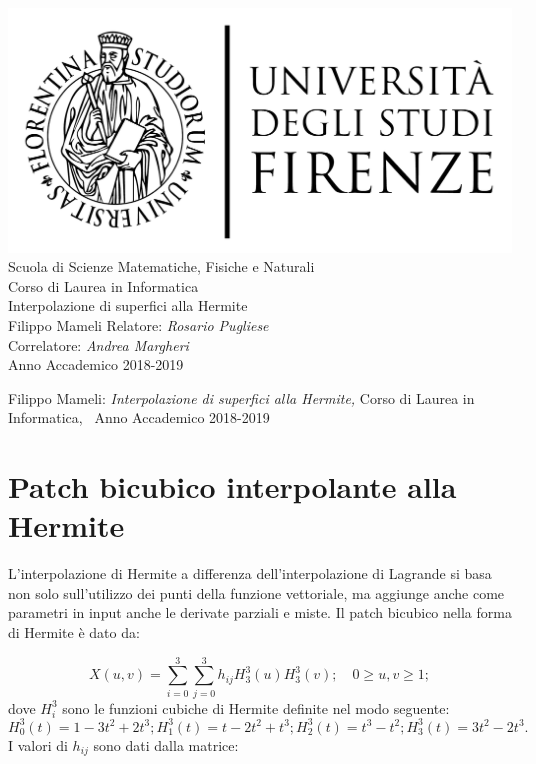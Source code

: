 \documentclass[12pt]{article}
\newcommand{\myItalianTitle}{Interpolazione di superfici alla Hermite}
\newcommand{\myDegree}{Corso di Laurea in Informatica\xspace}
\newcommand{\myName}{Filippo Mameli\xspace}
\newcommand{\myFaculty}{Scuola di Scienze Matematiche, Fisiche e Naturali\xspace}
\newcommand{\myUni}{\protect{Universit\`a degli Studi di Firenze}\xspace}
\newcommand{\myTime}{Anno Accademico 2018-2019\xspace}
\begin{document}
\begin{titlepage}
	\begin{center}
   	\large
      \hfill
      \vfill
      \begingroup
         \includegraphics[scale=0.3]{img/LOGO.pdf}\\
			\myFaculty \\
			\myDegree \\
			\vspace{0.5cm}
      \endgroup
      \vfill
      \begingroup
		  \myItalianTitle \\ 
	\bigskip
      \endgroup
      \myName
      \vfill
      \vfill
      Relatore: \emph{Rosario Pugliese}\\
      Correlatore: \emph{Andrea Margheri}\\
      \vfill
      \vfill
      \myTime
      \vfill
	\end{center}
\end{titlepage}
   \newpage
	\thispagestyle{empty}
	\hfill
	\vfill
	\noindent\myName:
	\textit{\myItalianTitle,}
	\myDegree, \textcopyright\ \myTime


\section{Patch bicubico interpolante alla Hermite}

L'interpolazione di Hermite a differenza dell'interpolazione di Lagrande si basa non solo
sull'utilizzo dei punti della funzione vettoriale, ma aggiunge anche come parametri in input
anche le derivate parziali e miste. Il patch bicubico nella forma di Hermite è dato da:

$$ X(u,v) = \sum_{i=0}^{3}\sum_{j=0}^{3} h_{ij}H_3^3(u)H_3^3(v); \hspace{1em} 0 \geq u, v \geq 1;$$
dove $H_i^3$ sono le funzioni cubiche di Hermite definite nel modo seguente:
$$H^3_0(t) = 1 - 3t^2 + 2t^3; H^3_1(t) = t -2t^2 + t^3; H^3_2(t) = t^3 - t^2; H^3_3(t) = 3t^2 - 2t^3.$$
I valori di $h_{ij}$ sono dati dalla matrice:
\end{document}
